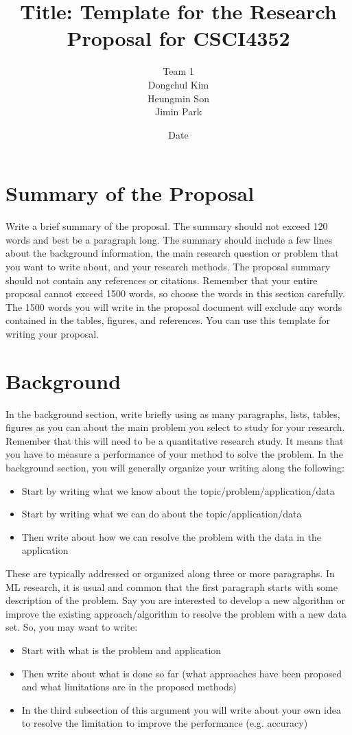 \documentclass[letterpaper]{article}
\title{Title: Template for the Research Proposal for CSCI4352}
\author{Team 1 \\ Dongchul Kim\\Heungmin Son\\Jimin Park}
\date{Date}
\begin{document}
\maketitle

\section*{Summary of the Proposal}
Write a brief summary of the proposal. The summary should not exceed 120 words and best be
a paragraph long. The summary should include a few lines about the background information,
the main research question or problem that you want to write about, and your research methods.
The proposal summary should not contain any references or citations. Remember that your entire
proposal cannot exceed 1500 words, so choose the words in this section carefully. The 1500 words
you will write in the proposal document will exclude any words contained in the tables, figures,
and references. You can use this template for writing your proposal.
\section*{Background}
In the background section, write briefly using as many paragraphs, lists, tables, figures as you can
about the main problem you select to study for your research. Remember that this will need to be
a quantitative research study. It means that you have to measure a performance of your method to solve the problem. In the background section, you will generally organize your writing
along the following:
\begin{itemize}
	\item Start by writing what we know about the topic/problem/application/data
	\item Start by writing what we can do about the topic/application/data
	\item Then write about how we can resolve the problem with the data in the application
\end{itemize}
These are typically addressed or organized along three or more paragraphs. In ML research, it
is usual and common that the first paragraph starts with some description of the problem. Say you are interested to develop a new algorithm or improve the existing approach/algorithm to resolve the problem with a new data set. So, you may want to write:
\begin{itemize}
	\item Start with what is the problem and application
	\item Then write about what is done so far (what approaches have been proposed and what limitations are in the proposed methods)
	\item In the third subsection of this argument you will write about your own idea to resolve the limitation to improve the performance (e.g. accuracy)
\end{itemize}
\end{document}
